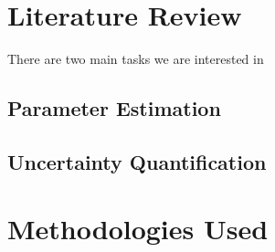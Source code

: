 \documentclass[12pt]{article}
\begin{document}
\section{Literature Review}

There are two main tasks we are interested in 

\subsection{Parameter Estimation}

\subsection{Uncertainty Quantification}











\section{}



\section{Methodologies Used}
\end{document}
